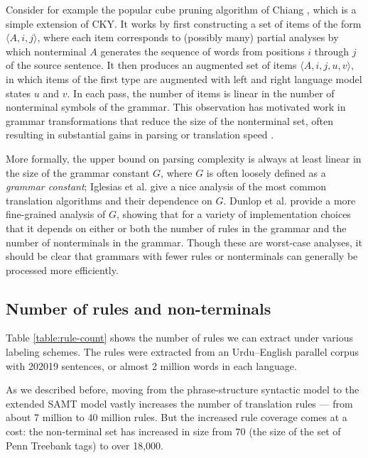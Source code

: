 \documentclass{article}
\begin{document}
Consider for example the popular cube pruning algorithm of Chiang
, which is a simple extension of CKY. It works by first
constructing a set of items of the form $\langle A, i, j \rangle$,
where each item corresponds to (possibly many) partial analyses by
which nonterminal $A$ generates the sequence of words from positions
$i$ through $j$ of the source sentence. It then produces an augmented
set of items $\langle A, i, j, u, v \rangle$, in which items of the
first type are augmented with left and right language model states $u$
and $v$. In each pass, the number of items is linear in the number of
nonterminal symbols of the grammar. This observation has motivated
work in grammar transformations that reduce the size of the
nonterminal set, often resulting in substantial gains in parsing or
translation speed \cite{song2008,denero-efficient-parsing,xiao2009}.

More formally, the upper bound on parsing complexity is always at
least linear in the size of the grammar constant $G$, where $G$ is
often loosely defined as a {\it grammar constant}; Iglesias et al.
 give a nice analysis of the most common translation algorithms
and their dependence on $G$. Dunlop et al.  provide a more
fine-grained analysis of $G$, showing that for a variety of
implementation choices that it depends on either or both the number of
rules in the grammar and the number of nonterminals in the grammar.
Though these are worst-case analyses, it should be clear that grammars
with fewer rules or nonterminals can generally be processed more
efficiently.

\subsection{Number of rules and non-terminals}

Table \ref{table:rule-count} shows the number of rules we can extract under various labeling schemes. The rules were extracted from an Urdu--English parallel corpus with 202019 sentences, or almost 2 million words in each language.

As we described before, moving from the phrase-structure syntactic model to the extended SAMT model vastly increases the number of translation rules --- from about 7 million to 40 million rules. But the increased rule coverage comes at a cost: the non-terminal set has increased in size from 70 (the size of the set of Penn Treebank tags) to over 18,000.
\end{document}
